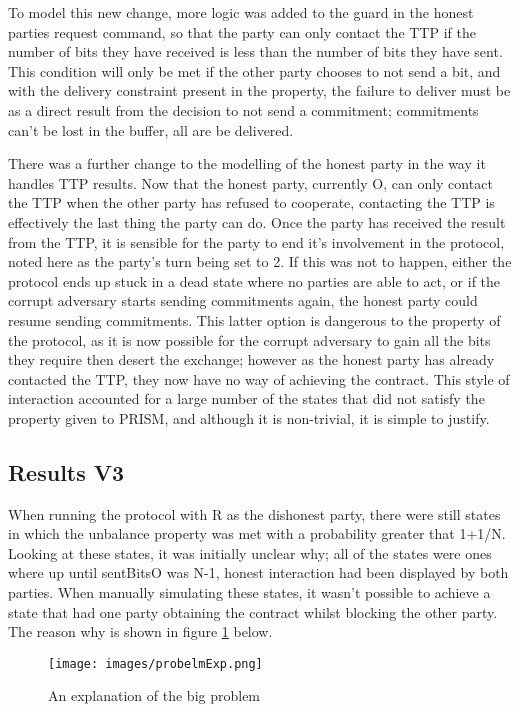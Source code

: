 \documentclass{l4proj}
\begin{document}
To model this new change, more logic was added to the guard in the honest parties request command, so that the party can only contact the TTP if the number of bits they have received is less than the number of bits they have sent. This condition will only be met if the other party chooses to not send a bit, and with the delivery constraint present in the property, the failure to deliver must be as a direct result from the decision to not send a commitment; commitments can't be lost in the buffer, all are be delivered.

There was a further change to the modelling of the honest party in the way it handles TTP results. Now that the honest party, currently O, can only contact the TTP when the other party has refused to cooperate, contacting the TTP is effectively the last thing the party can do. Once the party has received the result from the TTP, it is sensible for the party to end it's involvement in the protocol, noted here as the party's turn being set to 2. If this was not to happen, either the protocol ends up stuck in a dead state where no parties are able to act, or if the corrupt adversary starts sending commitments again, the honest party could resume sending commitments. This latter option is dangerous to the property of the protocol, as it is now possible for the corrupt adversary to gain all the bits they require then desert the exchange; however as the honest party has already contacted the TTP, they now have no way of achieving the contract. This style of interaction accounted for a large number of the states that did not satisfy the property given to PRISM, and although it is non-trivial, it is simple to justify. 

\subsection{Results V3}



When running the protocol with R as the dishonest party, there were still states in which the unbalance property was met with a probability greater that 1+1/N. Looking at these states, it was initially unclear why; all of the states were ones where up until sentBitsO was N-1, honest interaction had been displayed by both parties. When manually simulating these states, it wasn't possible to achieve a state that had one party obtaining the contract whilst blocking the other party. The reason why is shown in figure \ref{finalProblem} below.

\begin{figure}[ht!]
\centering
\texttt{[image: images/probelmExp.png]}
\caption{An explanation of the big problem}
\label{finalProblem}
\end{figure}
\end{document}
